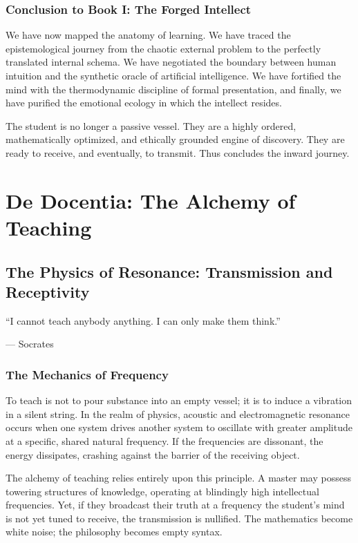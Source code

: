 \documentclass[11pt,a4paper,oneside]{book}
\theoremstyle{definition}
\theoremstyle{remark}
\begin{document}
\section{Conclusion to Book I: The Forged Intellect}
We have now mapped the anatomy of learning. We have traced the epistemological journey from the chaotic external problem to the perfectly translated internal schema. We have negotiated the boundary between human intuition and the synthetic oracle of artificial intelligence. We have fortified the mind with the thermodynamic discipline of formal presentation, and finally, we have purified the emotional ecology in which the intellect resides.

The student is no longer a passive vessel. They are a highly ordered, mathematically optimized, and ethically grounded engine of discovery. They are ready to receive, and eventually, to transmit. Thus concludes the inward journey.

\part{De Docentia: The Alchemy of Teaching}

\chapter{The Physics of Resonance: Transmission and Receptivity}
\epigraph{``I cannot teach anybody anything. I can only make them think.''}{--- Socrates}

\section{The Mechanics of Frequency}
To teach is not to pour substance into an empty vessel; it is to induce a vibration in a silent string. In the realm of physics, acoustic and electromagnetic resonance occurs when one system drives another system to oscillate with greater amplitude at a specific, shared natural frequency. If the frequencies are dissonant, the energy dissipates, crashing against the barrier of the receiving object. 

The alchemy of teaching relies entirely upon this principle. A master may possess towering structures of knowledge, operating at blindingly high intellectual frequencies. Yet, if they broadcast their truth at a frequency the student's mind is not yet tuned to receive, the transmission is nullified. The mathematics become white noise; the philosophy becomes empty syntax.
\end{document}
